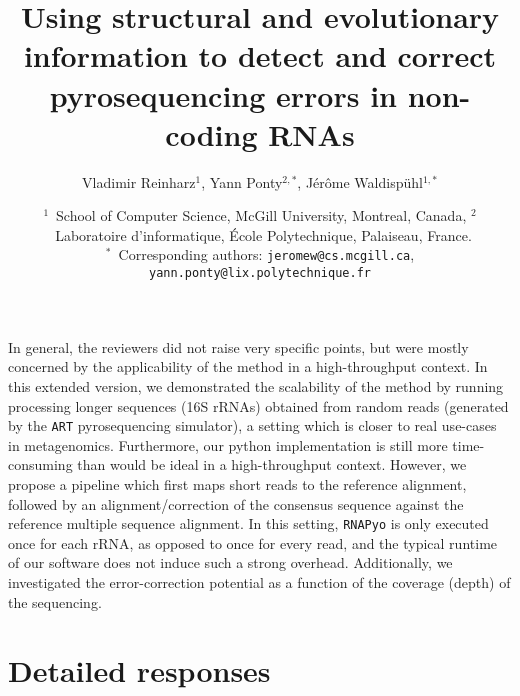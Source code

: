 \documentclass[11pt,hyperref,draft]{article} %
\title{Using structural and evolutionary information to detect and correct pyrosequencing errors in non-coding RNAs}
\author{Vladimir Reinharz$^1$, Yann Ponty$^{2,*}$, J\'er\^{o}me Waldisp\"{u}hl$^{1,*}$}
\date{$^1$~School of Computer Science, McGill University, Montreal, Canada, $^2$~Laboratoire d'informatique, \'Ecole Polytechnique, Palaiseau, France.\\ \small $^*$~Corresponding authors: \texttt{jeromew@cs.mcgill.ca}, \texttt{yann.ponty@lix.polytechnique.fr}}
\begin{document}
\maketitle

In general, the reviewers did not raise very specific points, but were mostly concerned by the applicability of the method in a high-throughput context. In this extended version, we demonstrated the scalability of the method by running processing longer sequences (16S rRNAs) obtained from random reads (generated by the {\tt ART} pyrosequencing simulator), a setting which is closer to real use-cases in metagenomics. Furthermore, our python implementation  is still more time-consuming than would be ideal in a high-throughput context. However, we propose a pipeline which first maps short reads to the reference alignment, followed by an alignment/correction of the consensus sequence against the reference multiple sequence alignment. In this setting, {\tt RNAPyo} is only executed once for each rRNA, as opposed to once for every read, and the typical runtime of our software does not induce such a strong overhead. Additionally, we investigated the error-correction potential as a function of the coverage (depth) of the sequencing.

\section*{Detailed responses}
\end{document}
